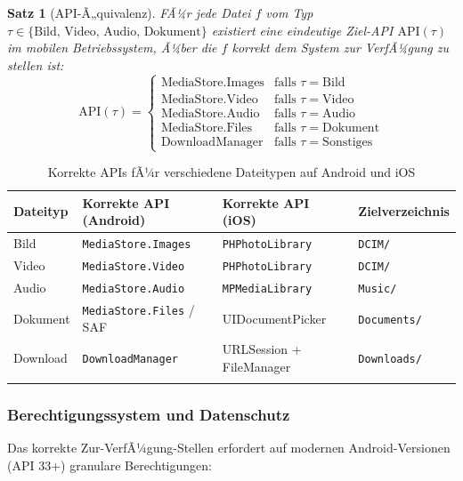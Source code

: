 ﻿\documentclass[12pt, a4paper]{article}
\newtheorem{satz}[definition]{Satz}
\begin{document}
\begin{satz}[API-Ã„quivalenz]
\label{satz:api}
FÃ¼r jede Datei $f$ vom Typ $\tau \in \{\text{Bild, Video, Audio, Dokument}\}$
existiert eine eindeutige Ziel-API $\text{API}(\tau)$ im mobilen Betriebssystem,
Ã¼ber die $f$ korrekt dem System zur VerfÃ¼gung zu stellen ist:
\[
  \text{API}(\tau) = \begin{cases}
    \text{MediaStore.Images} & \text{falls } \tau = \text{Bild} \\
    \text{MediaStore.Video}  & \text{falls } \tau = \text{Video} \\
    \text{MediaStore.Audio}  & \text{falls } \tau = \text{Audio} \\
    \text{MediaStore.Files}  & \text{falls } \tau = \text{Dokument} \\
    \text{DownloadManager}   & \text{falls } \tau = \text{Sonstiges}
  \end{cases}
\]
\end{satz}

\begin{longtable}{@{}p{2.5cm} p{3.5cm} p{3.5cm} p{3cm}@{}}
\toprule
\textbf{Dateityp} & \textbf{Korrekte API (Android)} & \textbf{Korrekte API (iOS)} & \textbf{Zielverzeichnis} \\
\midrule
\endhead
Bild & \texttt{MediaStore.Images} & \texttt{PHPhotoLibrary} & \texttt{DCIM/} \\
Video & \texttt{MediaStore.Video} & \texttt{PHPhotoLibrary} & \texttt{DCIM/} \\
Audio & \texttt{MediaStore.Audio} & \texttt{MPMediaLibrary} & \texttt{Music/} \\
Dokument & \texttt{MediaStore.Files} / SAF & UIDocumentPicker & \texttt{Documents/} \\
Download & \texttt{DownloadManager} & URLSession + FileManager & \texttt{Downloads/} \\
\bottomrule
\caption{Korrekte APIs fÃ¼r verschiedene Dateitypen auf Android und iOS}
\label{tab:apis}
\end{longtable}

\subsubsection{Berechtigungssystem und Datenschutz}

Das korrekte Zur-VerfÃ¼gung-Stellen erfordert auf modernen Android-Versionen
(API 33+) granulare Berechtigungen:
\end{document}
